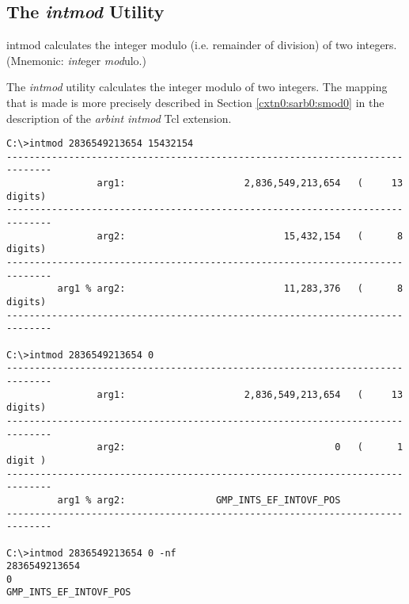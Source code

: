 \subsection{The \emph{intmod} Utility}
\label{cdcm0:sali0:smod0}

\begin{dosutilcommandname}{intmod}%
calculates the integer modulo (i.e. remainder of division) of 
two integers.
(Mnemonic:  \emph{int}eger
\emph{mod}ulo.)
\end{dosutilcommandname}

\begin{dosutilcommandsynopsis}
\end{dosutilcommandsynopsis}

\begin{dosutilcommanddescription}
The \emph{intmod} utility calculates the integer modulo
of two integers.  The mapping that is made is 
more precisely described in 
Section \cxtnzeroxrefhyphen{}\ref{cxtn0:sarb0:smod0} in the
description of the \emph{arbint intmod} Tcl extension.
\end{dosutilcommanddescription}

\begin{dosutilcommandsampleinvocations}
\begin{scriptsize}
\begin{verbatim}
C:\>intmod 2836549213654 15432154
------------------------------------------------------------------------------
                arg1:                     2,836,549,213,654   (     13 digits)
------------------------------------------------------------------------------
                arg2:                            15,432,154   (      8 digits)
------------------------------------------------------------------------------
         arg1 % arg2:                            11,283,376   (      8 digits)
------------------------------------------------------------------------------

C:\>intmod 2836549213654 0
------------------------------------------------------------------------------
                arg1:                     2,836,549,213,654   (     13 digits)
------------------------------------------------------------------------------
                arg2:                                     0   (      1 digit )
------------------------------------------------------------------------------
         arg1 % arg2:                GMP_INTS_EF_INTOVF_POS
------------------------------------------------------------------------------

C:\>intmod 2836549213654 0 -nf
2836549213654
0
GMP_INTS_EF_INTOVF_POS
\end{verbatim}
\end{scriptsize}
\end{dosutilcommandsampleinvocations}

